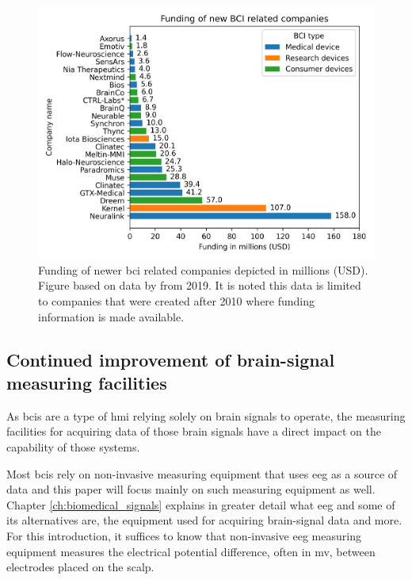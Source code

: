 \begin{figure}[ht]
    \centering
    \includegraphics[width=\linewidth]{../images/introduction/funding.pdf}
    \captionsetup{width=0.9\linewidth}
    \captionsetup{justification=centering}
    \caption{Funding of newer \gls{bci} related companies depicted in millions (USD).\\Figure based on data by \citet{bci_money} from 2019. It is noted this data is limited to companies that were created after 2010 where funding information is made available.}
    \label{fig:bci_money}
\end{figure}



\subsection{Continued improvement of brain-signal measuring facilities}
\label{subsec:bci_gaining_popularity_better_measuring}


As \glspl{bci} are a type of \gls{hmi} relying solely on brain signals to operate, the measuring facilities for acquiring data of those brain signals have a direct impact on the capability of those systems.

Most \glspl{bci} rely on non-invasive measuring equipment that uses \gls{eeg} as a source of data and this paper will focus mainly on such measuring equipment as well.
Chapter \ref{ch:biomedical_signals} explains in greater detail what \gls{eeg} and some of its alternatives are, the equipment used for acquiring brain-signal data and more.
For this introduction, it suffices to know that non-invasive \gls{eeg} measuring equipment measures the electrical potential difference, often in \gls{mv}, between electrodes placed on the scalp.

